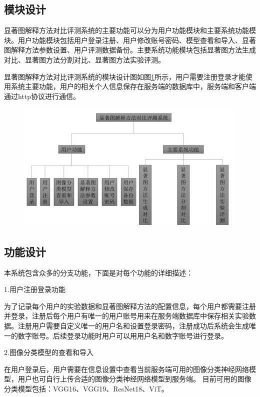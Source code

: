 \subsection{模块设计}
显著图解释方法对比评测系统的主要功能可以分为用户功能模块和主要系统功能模块。用户功能模块包括用户登录注册、用户修改账号密码、模型查看和导入、显著图解释方法参数设置、用户评测数据备份。主要系统功能模块包括显著图方法生成对比、显著图方法分割对比、显著图方法实验评测。

显著图解释方法对比评测系统的模块设计图如图\ref{fig:function}所示，用户需要注册登录才能使用系统主要功能，用户的相关个人信息保存在服务端的数据库中，服务端和客户端通过http协议进行通信。

\begin{figure}[h]
	\centering 
	\includegraphics[width=12cm]{fig/ch5/function.png}
	\label{fig:function}
\end{figure}

\subsection{功能设计}

本系统包含众多的分支功能，下面是对每个功能的详细描述：

1.用户注册登录功能

为了记录每个用户的实验数据和显著图解释方法的配置信息，每个用户都需要注册并登录，注册后每个用户有唯一的用户账号用来在服务端数据库中保存相关实验数据。注册用户需要自定义唯一的用户名和设置登录密码，注册成功后系统会生成唯一的数字账号。后续登录功能时用户可以用用户名和数字账号进行登录。

2.图像分类模型的查看和导入

在用户登录后，用户需要在信息设置中查看当前服务端可用的图像分类神经网络模型，用户也可自行上传合适的图像分类神经网络模型到服务端。
目前可用的图像分类模型包括：VGG16、VGG19、ResNet18、ViT。

